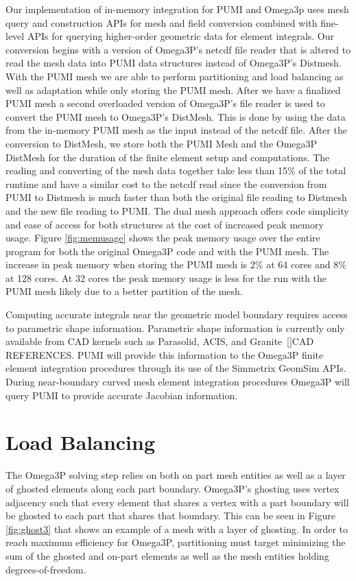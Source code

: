 \documentclass[a4paper]{article}
\begin{document}
Our implementation of in-memory integration for PUMI and Omega3p uses
mesh query and construction APIs for mesh and field conversion combined with
fine-level APIs for querying higher-order geometric data for element
integrals.
Our conversion begins with a version of Omega3P's netcdf file reader that is altered 
to read the mesh data into PUMI data structures instead of Omega3P's Distmesh. With 
the PUMI mesh we are able to perform partitioning and load balancing as well as adaptation 
while only storing the PUMI mesh. After we have a finalized PUMI mesh a second 
overloaded version of Omega3P's file reader is used to convert the PUMI mesh to 
Omega3P's DistMesh. This is done by using the data from the in-memory PUMI mesh as the 
input instead of the netcdf file. After the conversion to DistMesh, we store both the 
PUMI Mesh and the Omega3P DistMesh for the duration of the finite element setup and 
computations. The reading and converting of the mesh data together take less than 15\% 
of the total runtime and have a similar cost to the netcdf read since the conversion 
from PUMI to Distmesh is much faster than both the original file reading to Distmesh 
and the new file reading to PUMI. 
The dual mesh approach offers code simplicity and 
ease of access for both structures at the cost of increased peak memory usage. 
Figure \ref{fig:memusage} shows the peak memory usage over the entire program for both
the original Omega3P code and with the PUMI mesh. The increase in peak memory when 
storing the PUMI mesh is 2\% at 64 cores and 8\% at 128 cores. At 32 cores the 
peak memory usage is less for the run with the PUMI mesh likely due to a better 
partition of the mesh. 

Computing accurate integrals near the geometric model boundary requires
access to parametric shape information.
Parametric shape information is currently only available from CAD kernels such
as Parasolid, ACIS, and Granite~\ref{}CAD REFERENCES.
PUMI will provide this information to the Omega3P finite element integration
procedures through its use of the Simmetrix GeomSim APIs. 
During near-boundary curved mesh element integration procedures Omega3P will
query PUMI to provide accurate Jacobian information.

\section{Load Balancing}\label{sec:parma}

The Omega3P solving step relies on both on part mesh entities as well as a layer of 
ghosted elements along each part boundary. Omega3P's ghosting uses vertex adjacency such
that every element that shares a vertex with a part boundary will be ghosted to each part that shares that boundary. This can be seen in Figure \ref{fig:ghost3} that shows an 
example of a mesh with a layer of ghosting. In order to reach maximum efficiency
for Omega3P, partitioning must target minimizing the sum of the 
ghosted and on-part elements as well as the mesh entities holding degrees-of-freedom.
\end{document}

